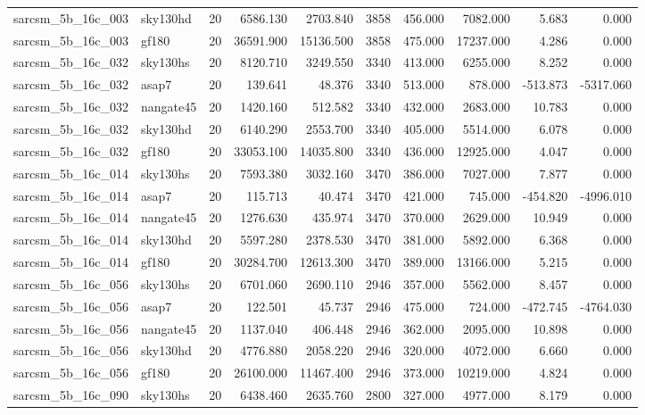\documentclass{article}
\begin{document}
\begin{longtable}{llrrrrrrrr}
sarcsm\_5b\_16c\_003 & sky130hd & 20 & 6586.130 & 2703.840 & 3858 & 456.000 & 7082.000 & 5.683 & 0.000 \\
sarcsm\_5b\_16c\_003 & gf180 & 20 & 36591.900 & 15136.500 & 3858 & 475.000 & 17237.000 & 4.286 & 0.000 \\
sarcsm\_5b\_16c\_032 & sky130hs & 20 & 8120.710 & 3249.550 & 3340 & 413.000 & 6255.000 & 8.252 & 0.000 \\
sarcsm\_5b\_16c\_032 & asap7 & 20 & 139.641 & 48.376 & 3340 & 513.000 & 878.000 & -513.873 & -5317.060 \\
sarcsm\_5b\_16c\_032 & nangate45 & 20 & 1420.160 & 512.582 & 3340 & 432.000 & 2683.000 & 10.783 & 0.000 \\
sarcsm\_5b\_16c\_032 & sky130hd & 20 & 6140.290 & 2553.700 & 3340 & 405.000 & 5514.000 & 6.078 & 0.000 \\
sarcsm\_5b\_16c\_032 & gf180 & 20 & 33053.100 & 14035.800 & 3340 & 436.000 & 12925.000 & 4.047 & 0.000 \\
sarcsm\_5b\_16c\_014 & sky130hs & 20 & 7593.380 & 3032.160 & 3470 & 386.000 & 7027.000 & 7.877 & 0.000 \\
sarcsm\_5b\_16c\_014 & asap7 & 20 & 115.713 & 40.474 & 3470 & 421.000 & 745.000 & -454.820 & -4996.010 \\
sarcsm\_5b\_16c\_014 & nangate45 & 20 & 1276.630 & 435.974 & 3470 & 370.000 & 2629.000 & 10.949 & 0.000 \\
sarcsm\_5b\_16c\_014 & sky130hd & 20 & 5597.280 & 2378.530 & 3470 & 381.000 & 5892.000 & 6.368 & 0.000 \\
sarcsm\_5b\_16c\_014 & gf180 & 20 & 30284.700 & 12613.300 & 3470 & 389.000 & 13166.000 & 5.215 & 0.000 \\
sarcsm\_5b\_16c\_056 & sky130hs & 20 & 6701.060 & 2690.110 & 2946 & 357.000 & 5562.000 & 8.457 & 0.000 \\
sarcsm\_5b\_16c\_056 & asap7 & 20 & 122.501 & 45.737 & 2946 & 475.000 & 724.000 & -472.745 & -4764.030 \\
sarcsm\_5b\_16c\_056 & nangate45 & 20 & 1137.040 & 406.448 & 2946 & 362.000 & 2095.000 & 10.898 & 0.000 \\
sarcsm\_5b\_16c\_056 & sky130hd & 20 & 4776.880 & 2058.220 & 2946 & 320.000 & 4072.000 & 6.660 & 0.000 \\
sarcsm\_5b\_16c\_056 & gf180 & 20 & 26100.000 & 11467.400 & 2946 & 373.000 & 10219.000 & 4.824 & 0.000 \\
sarcsm\_5b\_16c\_090 & sky130hs & 20 & 6438.460 & 2635.760 & 2800 & 327.000 & 4977.000 & 8.179 & 0.000 \\

\end{longtable}
\end{document}
